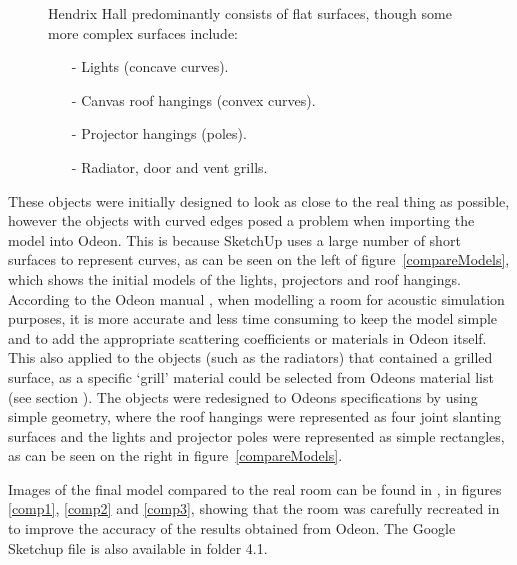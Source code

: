 \documentclass[../../main.tex]{subfiles}
\begin{document}
			\begin{figure}[H]
			Hendrix Hall predominantly consists of flat surfaces, though some more complex surfaces include:
			\begin{itemize}
				\item[-] Lights (concave curves).
				\item[-] Canvas roof hangings (convex curves).
				\item[-] Projector hangings (poles).
				\item[-] Radiator, door and vent grills.
			\end{itemize}
			\end{figure}

			These objects were initially designed to look as close to the real thing as possible, however the objects with curved edges posed a problem when importing the model into Odeon. This is because SketchUp uses a large number of short surfaces to represent curves, as can be seen on the left of figure~\ref{compareModels}, which shows the initial models of the lights, projectors and roof hangings. According to the Odeon manual \cite{odeonManual}, when modelling a room for acoustic simulation purposes, it is more accurate and less time consuming to keep the model simple and to add the appropriate scattering coefficients or materials in Odeon itself. This also applied to the objects (such as the radiators) that contained a grilled surface, as a specific `grill' material could be selected from Odeons material list (see section ). The objects were redesigned to Odeons specifications by using simple geometry, where the roof hangings were represented as four joint slanting surfaces and the lights and projector poles were represented as simple rectangles, as can be seen on the right in figure~\ref{compareModels}.

			Images of the final model compared to the real room can be found in , in figures \ref{comp1}, \ref{comp2} and \ref{comp3}, showing that the room was carefully recreated in to improve the accuracy of the results obtained from Odeon. The Google Sketchup file is also available in folder 4.1.
\end{document}
